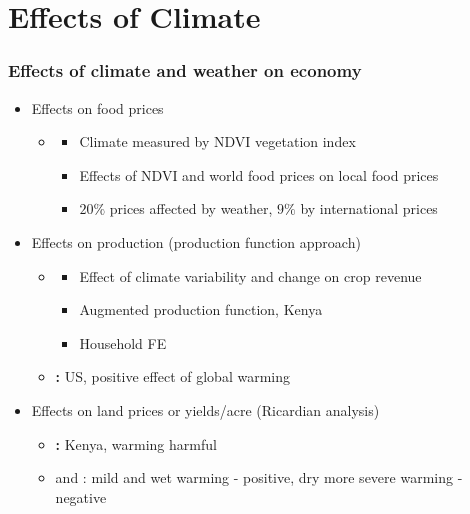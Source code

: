 \documentclass{beamer}              %
\begin{document}
\section{Effects of Climate}

\begin{frame}

\frametitle{Effects of climate and weather on economy}\label{EffectsCLimate} 


\begin{itemize}

\item Effects on food prices

\begin{itemize}

\item \textbf{\cite{Brown2015}}
\begin{itemize}
\item  Climate measured by NDVI vegetation index 
\item  Effects of NDVI and world food prices on local food prices
\item $20\%$ prices affected by weather, $9\%$ by international prices
\end{itemize}

\end{itemize}


\item Effects on production (production function approach)
\begin{itemize}
\item \textbf{\cite{Ochieng2016}}
\begin{itemize}
\item Effect of climate variability and change on crop revenue
\item Augmented production function, Kenya
\item  Household FE
\end{itemize}
\item \textbf{\cite{Deschenes2007Ric}:} US, positive effect of global warming
\end{itemize}
\item Effects on land prices or yields/acre (Ricardian analysis)
\begin{itemize}
\item  \textbf{\citet{kabubo2007}:} Kenya, warming harmful

\item  \cite{SeoMendelsohn} and \cite{KMendelsohn2008}: mild and wet warming - positive, dry more severe warming - negative


\end{itemize}

\end{itemize}
\end{frame}
\end{document}
